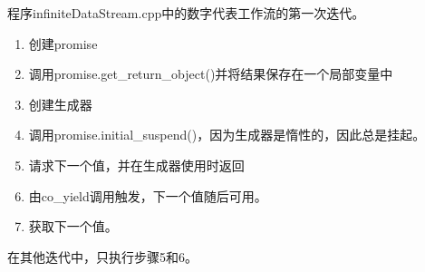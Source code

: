 
程序infiniteDataStream.cpp中的数字代表工作流的第一次迭代。

\begin{enumerate}
\item 
创建promise

\item 
调用promise.get\_return\_object()并将结果保存在一个局部变量中
 
\item 
创建生成器

\item 
调用promise.initial\_suspend()，因为生成器是惰性的，因此总是挂起。

\item 
请求下一个值，并在生成器使用时返回

\item 
由co\_yield调用触发，下一个值随后可用。

\item 
获取下一个值。
\end{enumerate}

在其他迭代中，只执行步骤5和6。


